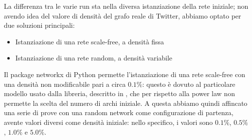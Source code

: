 \documentclass[a4paper,12pt]{article}
\begin{document}
La differenza tra le varie run sta nella diversa istanziazione della rete iniziale; non avendo idea del valore di densità del grafo reale di Twitter, abbiamo optato per due soluzioni principali:
\begin{itemize}
\item Istanziazione di una rete scale-free, a densità fissa
\item Istanziazione di una rete random, a densità variabile
\end{itemize}
Il package networkx di Python permette l'istanziazione di una rete scale-free con una densità non modificabile pari a circa $0.1\%$: questo è dovuto al particolare modello usato dalla libreria, descritto in \cite{sfnx}, che per rispetto alla power law non permette la scelta del numero di archi iniziale.
A questa abbiamo quindi affincato una serie di prove con una random network come configurazione di partenza, avente valori diversi come densità iniziale: nello specifico, i valori sono $0.1\%$, $0.5\%$, $1.0\%$ e $5.0\%$.
\end{document}
